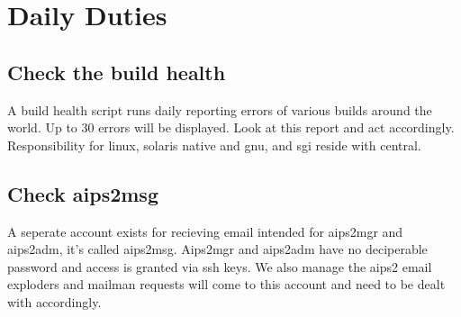 \chapter{Daily Duties}
\section{Check the build health}
A build health script runs daily reporting errors of various builds around the world.  Up to 30
errors will be displayed. Look at this report and act accordingly.  Responsibility for linux, solaris native and gnu, and sgi reside with \aipspp central.
\section{Check aips2msg}
A seperate account exists for recieving email intended for aips2mgr and aips2adm, it's called
aips2msg.  Aips2mgr and
aips2adm have no deciperable password and access is granted via ssh keys.  We also manage the
aips2 email exploders and mailman requests will come to this account and need to be dealt with
accordingly.
